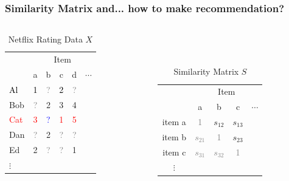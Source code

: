 \documentclass[xcolor={dvipsnames}]{beamer}
\begin{document}
\frame
{
\frametitle{Similarity Matrix and... {{how to make recommendation?}}}


\begin{columns}
\begin{column}{.5\textwidth}

\begin{table}
\begin{tabular}{|l|ccccc|}
\hline
  & \multicolumn{5}{|c|}{Item} \\
    & a & b & c & d & $\cdots$ \\ \hline
\textcolor{black}{Al} & \textcolor{black}{1} & \textcolor{gray}{?} & \textcolor{black}{2 }& \textcolor{gray}{?} &\\ 
Bob & \textcolor{gray}{?} & 2 & 3 & 4 &\\ 
\textcolor{red}{Cat} & \textcolor{red}{3} & \textcolor{blue}{?} & \textcolor{red}{1} & \textcolor{red}{5}&\\ 
Dan & \textcolor{gray}{?} & 2 & \textcolor{gray}{?} & \textcolor{gray}{?}& \\
Ed & 2 &   \textcolor{gray}{?} & \textcolor{gray}{?} & 1&\\
$\vdots$ &&&&&\\ \hline
\end{tabular}
\caption{Netflix Rating Data $X$}
\end{table}


\end{column}
\begin{column}{.5\textwidth}

\vspace{-.4em}
${}$\\${}$\\

\begin{table}
\begin{tabular}{c||c|c|c|c||}
  & \multicolumn{4}{|c||}{Item}  \\
& a &  b &  c & $\cdots$ \\\hline \hline
item a &\textcolor{gray}{1}&$s_{12}$&$s_{13}$& \\ \hline
item b &\textcolor{gray}{$s_{21}$}&\textcolor{gray}{1}&$s_{23}$& \\ \hline
item c &\textcolor{gray}{$s_{31}$}&\textcolor{gray}{$s_{32}$}&\textcolor{gray}{1}& \\ \hline
$\vdots$ &&&& \\ \hline \hline
\end{tabular}
\caption{Similarity Matrix $S$}  
\end{table}


\end{column}
\end{columns}}
\end{document}
